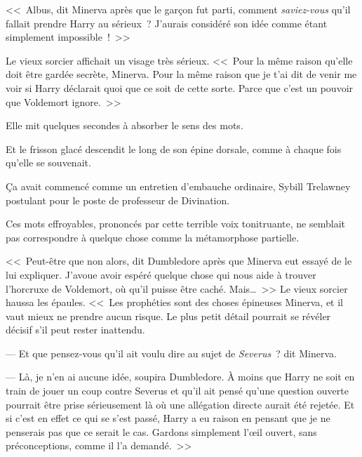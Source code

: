 \later

<<~Albus, dit Minerva après que le garçon fut parti, comment \emph{saviez-vous} qu'il fallait prendre Harry au sérieux~? J'aurais considéré son idée comme étant simplement impossible~!~>>

Le vieux sorcier affichait un visage très sérieux. <<~Pour la même raison qu'elle doit être gardée secrète, Minerva. Pour la même raison que je t'ai dit de venir me voir si Harry déclarait quoi que ce soit de cette sorte. Parce que c'est un pouvoir que Voldemort ignore.~>>

Elle mit quelques secondes à absorber le sens des mots.

Et le frisson glacé descendit le long de son épine dorsale, comme à chaque fois qu'elle se souvenait.

Ça avait commencé comme un entretien d'embauche ordinaire, Sybill Trelawney postulant pour le poste de professeur de Divination.


Ces mots effroyables, prononcés par cette terrible voix tonitruante, ne semblait pas correspondre à quelque chose comme la métamorphose partielle.

<<~Peut-être que non alors, dit Dumbledore après que Minerva eut essayé de le lui expliquer. J'avoue avoir espéré quelque chose qui nous aide à trouver l'horcruxe de Voldemort, où qu'il puisse être caché. Mais…~>> Le vieux sorcier haussa les épaules. <<~Les prophéties sont des choses épineuses Minerva, et il vaut mieux ne prendre aucun risque. Le plus petit détail pourrait se révéler décisif s'il peut rester inattendu.

--- Et que pensez-vous qu'il ait voulu dire au sujet de \emph{Severus}~? dit Minerva.

--- Là, je n'en ai aucune idée, soupira Dumbledore. À moins que Harry ne soit en train de jouer un coup contre Severus et qu'il ait pensé qu'une question ouverte pourrait être prise sérieusement là où une allégation directe aurait été rejetée. Et si c'est en effet ce qui se s'est passé, Harry a eu raison en pensant que je ne penserais pas que ce serait le cas. Gardons simplement l'œil ouvert, sans préconceptions, comme il l'a demandé.~>>

